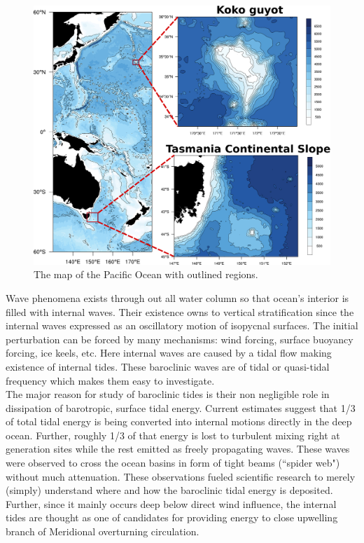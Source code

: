 \begin{figure}
\includegraphics[scale=0.5]{../figures/map_w_places.pdf}
\caption{The map of the Pacific Ocean with outlined regions.}
\end{figure}
Wave phenomena exists through out all water column so that ocean's interior is filled with internal waves. Their existence owns to vertical stratification since the internal waves  expressed as an oscillatory motion of isopycnal surfaces. The initial perturbation can be forced by many mechanisms: wind forcing, surface buoyancy forcing, ice keels, etc. Here internal waves are caused by a tidal flow making existence of internal tides. These baroclinic waves are of tidal or quasi-tidal frequency which makes them easy to investigate.\\
The major reason for study of baroclinic tides is their non negligible role in dissipation of barotropic, surface tidal energy. Current estimates suggest that 1/3 of total tidal energy is being converted into internal motions directly in the deep ocean. Further, roughly 1/3 of that energy is lost to turbulent mixing right at generation sites while the rest emitted as freely propagating waves. These waves were observed to cross the ocean basins in form of tight beams (``spider web") without much attenuation. These observations fueled scientific research to merely (simply) understand where and how the baroclinic tidal energy is deposited. Further, since it mainly occurs deep below direct wind influence, the internal tides are thought as one of candidates for providing energy to close upwelling branch of Meridional overturning circulation.\\
